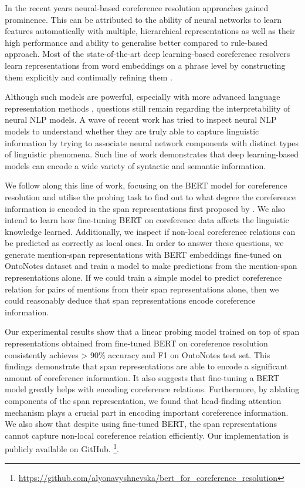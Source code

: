 \documentclass[11pt]{article}
\begin{document}
In the recent years neural-based coreference resolution approaches gained prominence. This can be attributed to the ability of neural networks to learn features automatically with multiple, hierarchical representations as well as their high performance and ability to generalise better compared to rule-based approach. Most of the state-of-the-art deep learning-based coreference resolvers learn representations from word embeddings on a phrase level by constructing them explicitly \parencite{lee2017end} and continually refining them \parencite{lee2018higher,kantor-globerson-2019-coreference}.

Although such models are powerful, especially with more advanced language representation methods \parencite{devlin2019bert,peters2018elmo}, questions still remain regarding the interpretability of neural NLP models. A wave of recent work has tried to inspect neural NLP models to understand whether they are truly able to capture linguistic information by trying to associate neural network components with distinct types of linguistic phenomena. Such line of work \parencite{shi2016string,liu2019linguistic,tenney2019context} demonstrates that deep learning-based models can encode a wide variety of syntactic and semantic information. 

We follow along this line of work, focusing on the BERT model for coreference resolution \parencite{joshi2019coref} and utilise the probing task \parencite{tenney2019context,liu2019linguistic} to find out to what degree the coreference information is encoded in the span representations first proposed by \textcite{lee2017end}. We also intend to learn how fine-tuning BERT on coreference data affects the linguistic knowledge learned. Additionally, we inspect if non-local coreference relations can be predicted as  correctly as local ones. In order to answer these questions, we generate mention-span representations with BERT embeddings fine-tuned on OntoNotes dataset \parencite{conll} and train a model to make predictions from the mention-span representations alone. If we could train a simple model to predict coreference relation for pairs of mentions from their span representations alone, then we could reasonably deduce that span representations encode coreference information.

Our experimental results show that a linear probing model trained on top of span representations obtained from fine-tuned BERT on coreference resolution consistently achieves > 90\% accuracy and F1 on OntoNotes test set. This findings demonstrate that span representations are able to encode a significant amount of coreference information. It also suggests that fine-tuning a BERT model greatly helps with encoding coreference relations. Furthermore, by ablating components of the span representation, we found that head-finding attention mechanism plays a crucial part in encoding important coreference information. We also show that despite using fine-tuned BERT, the span representations cannot capture non-local coreference relation efficiently. Our implementation is publicly available on GitHub.  \footnote{\url{https://github.com/alyonavyshnevska/bert_for_coreference_resolution}}.
\end{document}
